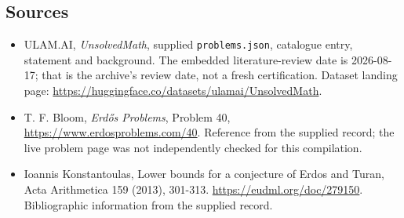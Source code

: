 \documentclass[11pt,a4paper]{article}
\begin{document}
\subsection{Sources}

{\small

\begin{itemize}

\item[\hypertarget{source:statement:1}{S1}] ULAM.AI, \emph{UnsolvedMath}, supplied \texttt{problems.json}, catalogue entry, statement and background. The embedded literature-review date is 2026-08-17; that is the archive’s review date, not a fresh certification. Dataset landing page: \url{https://huggingface.co/datasets/ulamai/UnsolvedMath}.

\item[\hypertarget{source:statement:2}{S2}] T. F. Bloom, \emph{Erdős Problems}, Problem 40, \url{https://www.erdosproblems.com/40}. Reference from the supplied record; the live problem page was not independently checked for this compilation.

\item[\hypertarget{source:statement:3}{S3}] Ioannis Konstantoulas, Lower bounds for a conjecture of Erdos and Turan, Acta Arithmetica 159 (2013), 301-313. \url{https://eudml.org/doc/279150}. Bibliographic information from the supplied record.

\end{itemize}

}

\label{end:statement}
\end{document}
